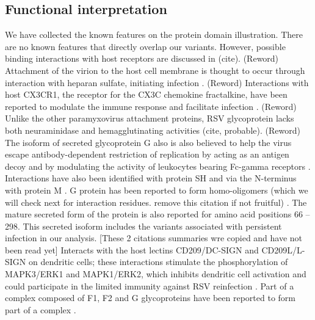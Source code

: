 \documentclass{article}
\begin{document}

\subsection{Functional interpretation}
We have collected the known features on the protein domain illustration.
There are no known features that directly overlap our variants. 
However, possible binding interactions with host receptors are discussed in (cite).
(Reword) Attachment of the virion to the host cell membrane is thought to occur through interaction with heparan sulfate, initiating infection 
\cite{levine1987demonstration, feldman1999identification, feldman2000fusion}.
(Reword) Interactions with host CX3CR1, the receptor for the CX3C chemokine fractalkine, have been reported to modulate the immune response and facilitate infection 
\cite{johnson2015respiratory, tripp2001cx3c, jeong2015cx3cr1}.
(Reword) Unlike the other paramyxovirus attachment proteins, RSV glycoprotein lacks both neuraminidase and hemagglutinating activities (cite, probable).
(Reword) The isoform of secreted glycoprotein G also is also believed to help the virus escape antibody-dependent restriction of replication by acting as an antigen decoy and by modulating the activity of leukocytes bearing Fc-gamma receptors 
\cite{bukreyev2008secreted}.
Interactions  have also been identified with protein SH 
\cite{rixon2005respiratory} 
and via the N-terminus with protein M 
\cite{ghildyal2005interaction}.
G protein has been reported to form homo-oligomers (which we will check next for interaction residues. remove this citation if not fruitful)
\cite{collins1992oligomerization}.
The mature secreted form of the protein is also reported for amino acid positions 66 – 298.
This secreted isoform includes the variants associated with persistent infection in our analysis. 
[These 2 citations summaries wre copied and have not been read yet] Interacts with the host lectins CD209/DC-SIGN and CD209L/L-SIGN on dendritic cells; these interactions stimulate the phosphorylation of MAPK3/ERK1 and MAPK1/ERK2, which inhibits dendritic cell activation and could participate in the limited immunity against RSV reinfection 
\cite{johnson2012respiratory}.
Part of a complex composed of F1, F2 and G glycoproteins have been reported to form part of a complex
\cite{low2008rsv}.
\end{document}
